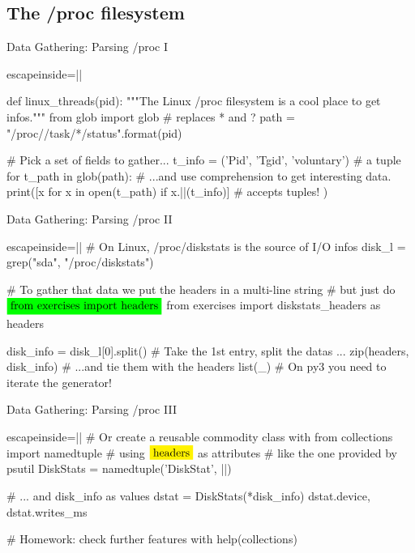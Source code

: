\subsection{The /proc filesystem}
\begin{pyframe}{Data Gathering: Parsing /proc I}
\begin{pycode*}{escapeinside=||}

def linux_threads(pid):
  """The Linux /proc filesystem is a cool place to get infos."""
  from glob import glob  # replaces * and ?
  path = "/proc/{}/task/*/status".format(pid)
  
  # Pick a set of fields to gather...
  t_info = ('Pid', 'Tgid', 'voluntary') # a tuple
  for t_path in glob(path):
    # ...and use comprehension to get interesting data.
    print([x for x in open(t_path) 
        if x.||(t_info)] #  accepts tuples!
    )
\end{pycode*}
\end{pyframe}



\begin{pyframe}{Data Gathering: Parsing /proc II}
\begin{pycode*}{escapeinside=||}
# On Linux, /proc/diskstats is the source of I/O infos
disk_l = grep("sda", "/proc/diskstats")

# To gather that data we put the headers in a multi-line string
#  but just do $\typeonly{from exercises import headers}$
from exercises import diskstats_headers as headers

        
disk_info = disk_l[0].split() # Take the 1st entry, split the datas ...
zip(headers, disk_info)          # ...and tie them with the headers
list(_) # On py3 you need to iterate the generator!
\end{pycode*}
\end{pyframe}

\begin{pyframe}{Data Gathering: Parsing /proc III}
\begin{pycode*}{escapeinside=||}
# Or create a reusable commodity class with
from collections import namedtuple
# using $\pyver{headers}$ as attributes
#  like the one provided by psutil
DiskStats = namedtuple('DiskStat', ||)

# ... and disk_info as values
dstat = DiskStats(*disk_info)
dstat.device, dstat.writes_ms

# Homework: check further features with
help(collections) 
\end{pycode*}
\end{pyframe}


\iffalse
\begin{pyframe}{Data Gathering: subprocess}
\begin{pycode}
# foo
\end{pycode}
\end{pyframe}

\fi
